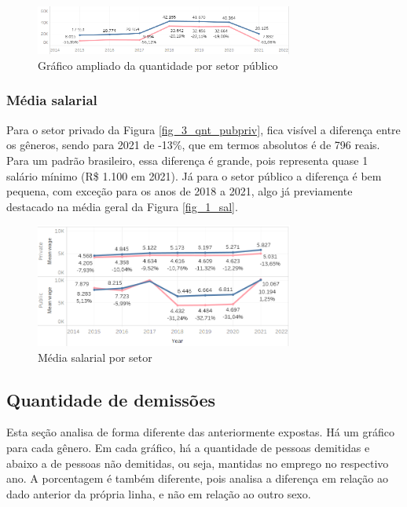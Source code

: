 \begin{figure}[htbp]
	\centerline{
		\includegraphics[width=85mm]{assets/3_1_qnt_pubpriv.PNG}
	}
	\caption{Gráfico ampliado da quantidade por setor público}
	\label{fig_3_1_qnt_pubpriv}
\end{figure}

\subsubsection{Média salarial}

Para o setor privado da Figura \ref{fig_3_qnt_pubpriv}, fica visível a diferença entre os gêneros, sendo para 2021 de -13\%, que em termos absolutos é de 796 reais. Para um padrão brasileiro, essa diferença é grande, pois representa quase 1 salário mínimo (R\$ 1.100 em 2021). Já para o setor público a diferença é bem pequena, com exceção para os anos de 2018 a 2021, algo já previamente destacado na média geral da Figura \ref{fig_1_sal}.

\begin{figure}[htbp]
	\centerline{
		\includegraphics[width=85mm]{assets/3_sal_pubpriv.PNG}
	}
	\caption{Média salarial por setor}
	\label{fig_3_sal_pubpriv}
\end{figure}

\subsection{Quantidade de demissões}

Esta seção analisa de forma diferente das anteriormente expostas. Há um gráfico para cada gênero. Em cada gráfico, há a quantidade de pessoas demitidas e abaixo a de pessoas não demitidas, ou seja, mantidas no emprego no respectivo ano. A porcentagem é também diferente, pois analisa a diferença em relação ao dado anterior da própria linha, e não em relação ao outro sexo.

